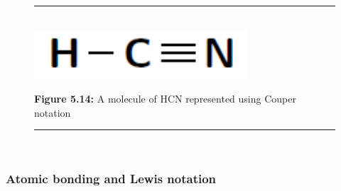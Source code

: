 	\begin{figure}[H] %
    \begin{center}
    \rule[.1in]{\figurerulewidth}{.005in} \\
        \label{m38701*uid22!!!underscore!!!media}\label{m38701*uid22!!!underscore!!!printimage}\includegraphics[width=300px]{col11305.imgs/m38701_CG11C1_016.png} %
        
      \vspace{2pt}
    \vspace{\rubberspace}\par \begin{cnxcaption}
	  \small \textbf{Figure 5.14: }A molecule of \begin{math}\mathrm{HCN}\end{math} represented using Couper notation
	\end{cnxcaption}
      
    \vspace{.1in}
    \rule[.1in]{\figurerulewidth}{.005in} \\
        
    \end{center}

 \end{figure}   

    \addtocounter{footnote}{-0}
    

\label{m38701*secfhsst!!!underscore!!!id327}
            \subsubsection{  Atomic bonding and Lewis notation
      }
            \nopagebreak
            
